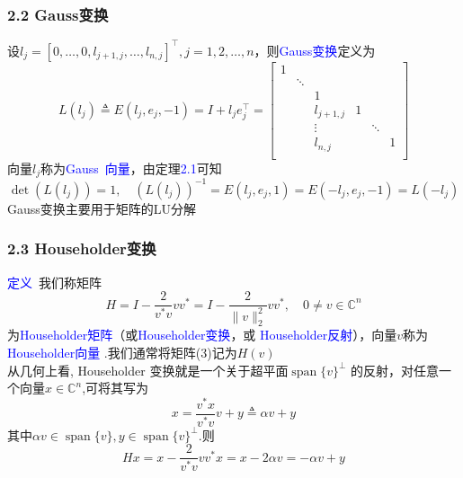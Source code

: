 \documentclass[notheorems,serif]{beamer}
\begin{document}
\begin{frame}
\frametitle{2.2 Gauss变换}
\noindent 设$l_{j}=\left[0, \ldots, 0, l_{j+1, j}, \ldots, l_{n,
	j}\right]^{\top}, j=1,2, \ldots, n$，则\textcolor{blue}{Gauss变换}定义为$$
L\left(l_{j}\right) \triangleq E\left(l_{j}, e_{j},-1\right)=I+l_{j}
e_{j}^{\top}=\begin{bmatrix}
1 &  &  &  &   &  \\
& \ddots &  &  &  & \\
& & 1 & & & \\
& & l_{j+1,j}& 1  & & \\
& & \vdots & & \ddots & \\
& & l_{n,j} & & & 1\\
\end{bmatrix}
$$
向量$l_j$称为\textcolor{blue}{Gauss~向量}，由定理\textcolor{blue}{2.1}可知$$
\operatorname{det}\left(L\left(l_{j}\right)\right)=1, \quad\left(L\left(l_{j}\right)\right)^{-1}=E\left(l_{j}, e_{j}, 1\right)=E\left(-l_{j}, e_{j},-1\right)=L\left(-l_{j}\right)
$$
Gauss变换主要用于矩阵的LU分解
\end{frame}
\begin{frame}
\frametitle{2.3 Householder变换}
\noindent \textcolor{blue}{定义}~我们称矩阵
\begin{equation}
H=I-\frac{2}{v^{*} v} v v^{*}=I-\frac{2}{\|v\|_{2}^{2}} v v^{*}, \quad 0 \neq v \in \mathbb{C}^{n}
\end{equation}
为\textcolor{blue}{Householder矩阵}（或\textcolor{blue}{Householder变换}，或
\textcolor{blue}{Householder反射}），向量$v$称为\textcolor{blue}{Householder向量
}.我们通常将矩阵(3)记为$H(v)$\\

从几何上看, Householder 变换就是一个关于超平面$\operatorname{span}\{v\}^{\perp}$
的反射，对任意一个向量$x \in \mathbb{C}^{n}$,可将其写为$$x=\frac{v^{*} x}{v^{*} v} v+y \triangleq \alpha v+y$$
其中$\alpha v \in \operatorname{span}\{v\}, y \in
\operatorname{span}\{v\}^{\perp}$.则$$H x=x-\frac{2}{v^{*} v} v v^{*} x=x-2 \alpha v=-\alpha v+y$$
\end{frame}
\end{document}
